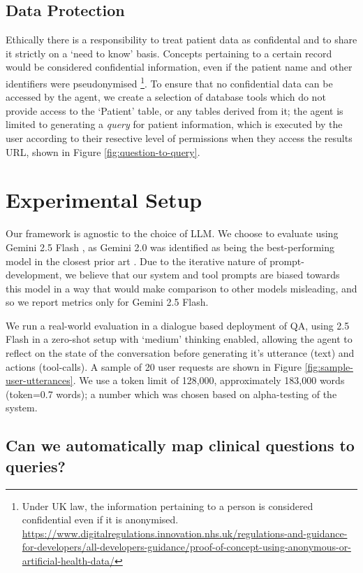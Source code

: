 \documentclass[11pt]{article}
\begin{document}
\subsection{Data Protection} 
Ethically there is a responsibility to treat patient data as confidental and to share it strictly on a `need to know' basis.
Concepts pertaining to a certain record would be considered confidential information, even if the patient name and other identifiers were pseudonymised
\footnote{Under UK law, the information pertaining to a person is considered confidential even if it is anonymised.
\url{https://www.digitalregulations.innovation.nhs.uk/regulations-and-guidance-for-developers/all-developers-guidance/proof-of-concept-using-anonymous-or-artificial-health-data/}
}. 
To ensure that no confidential data can be accessed by the agent, we create a selection of database tools which do not provide access to the `Patient' table, or any tables derived from it; the agent is limited to generating a \textit{query} for patient information, which is executed by the user according to their resective level of permissions when they access the results URL, shown in Figure \ref{fig:question-to-query}.


\section{Experimental Setup}
Our framework is agnostic to the choice of LLM. We choose to evaluate using Gemini 2.5 Flash \citet{comanici_gemini_2025}, as Gemini 2.0 was identified as being the best-performing model in the closest prior art \citet{ziletti_generating_2025}.
Due to the iterative nature of prompt-development, we believe that our system and tool prompts are biased towards this model in a way that would make comparison to other models misleading, and so we report metrics only for Gemini 2.5 Flash.

We run a real-world evaluation in a dialogue based deployment of QA, using 2.5 Flash in a zero-shot setup with `medium' thinking enabled, allowing the agent to reflect on the state of the conversation before generating it's utterance (text) and actions (tool-calls). A sample of 20 user requests are shown in Figure \ref{fig:sample-user-utterances}. We use a token limit of 128,000, approximately 183,000 words (token=0.7 words); a number which was chosen based on alpha-testing of the system.

\subsection*{Can we automatically map clinical questions to queries?}
\end{document}
